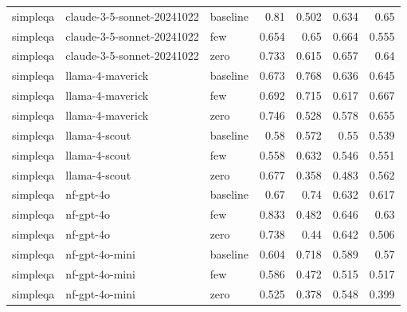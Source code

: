 \begin{table}[htbp]
\begin{tabular}{lllrrrr}
simpleqa & claude-3-5-sonnet-20241022 & baseline & 0.81 & 0.502 & 0.634 & 0.65 \\
simpleqa & claude-3-5-sonnet-20241022 & few & 0.654 & 0.65 & 0.664 & 0.555 \\
simpleqa & claude-3-5-sonnet-20241022 & zero & 0.733 & 0.615 & 0.657 & 0.64 \\
simpleqa & llama-4-maverick & baseline & 0.673 & 0.768 & 0.636 & 0.645 \\
simpleqa & llama-4-maverick & few & 0.692 & 0.715 & 0.617 & 0.667 \\
simpleqa & llama-4-maverick & zero & 0.746 & 0.528 & 0.578 & 0.655 \\
simpleqa & llama-4-scout & baseline & 0.58 & 0.572 & 0.55 & 0.539 \\
simpleqa & llama-4-scout & few & 0.558 & 0.632 & 0.546 & 0.551 \\
simpleqa & llama-4-scout & zero & 0.677 & 0.358 & 0.483 & 0.562 \\
simpleqa & nf-gpt-4o & baseline & 0.67 & 0.74 & 0.632 & 0.617 \\
simpleqa & nf-gpt-4o & few & 0.833 & 0.482 & 0.646 & 0.63 \\
simpleqa & nf-gpt-4o & zero & 0.738 & 0.44 & 0.642 & 0.506 \\
simpleqa & nf-gpt-4o-mini & baseline & 0.604 & 0.718 & 0.589 & 0.57 \\
simpleqa & nf-gpt-4o-mini & few & 0.586 & 0.472 & 0.515 & 0.517 \\
simpleqa & nf-gpt-4o-mini & zero & 0.525 & 0.378 & 0.548 & 0.399 \\
\bottomrule
\end{tabular}
\end{table}

